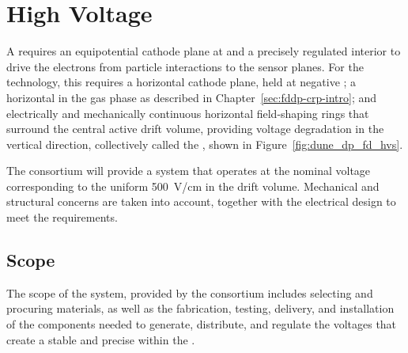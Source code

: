 \chapter{High Voltage}
\label{ch:dp-hv}

\label{sec:fddp-hv-ov}

\label{sec:fddp-hv-intro}

A  requires an equipotential cathode plane at  and a precisely regulated interior \efield to drive the
electrons from particle interactions to the sensor planes. For the  %
 technology, 
this requires a horizontal cathode plane, held at negative ; a horizontal  in the gas phase as described in Chapter~\ref{sec:fddp-crp-intro}; %
and electrically and mechanically continuous  horizontal field-shaping rings that surround the central active drift volume, providing voltage degradation in the vertical direction, collectively called the , shown in Figure~\ref{fig:dune_dp_fd_hvs}.


The  consortium will provide a system that operates at the nominal voltage corresponding to the uniform \SI{500}{V/cm} \efield in the  drift volume. 
Mechanical and structural concerns are taken into account, together with the electrical design to meet the requirements. 

\section{Scope}
\label{sec:fddp-hv-scope}
The scope of the \dual {} system, provided by the   consortium includes selecting and procuring materials, as well as the fabrication, testing, delivery, and installation of the components needed to generate, distribute, and regulate the voltages that create a stable and precise \efield{} within the . 

